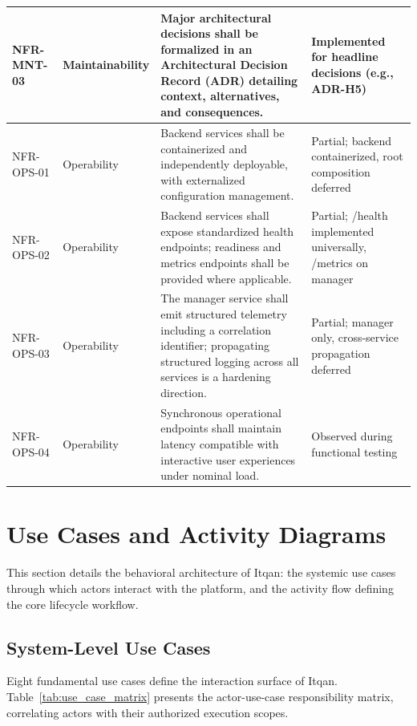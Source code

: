 \begin{longtable}{|p{2.2cm}|p{2.7cm}|>{\RaggedRight\arraybackslash}p{5.8cm}|p{2.7cm}|}
NFR-MNT-03 & Maintainability & Major architectural decisions shall be formalized in an Architectural Decision Record (ADR) detailing context, alternatives, and consequences. & Implemented for headline decisions (e.g., ADR-H5) \\ \hline
NFR-OPS-01 & Operability & Backend services shall be containerized and independently deployable, with externalized configuration management. & Partial; backend containerized, root composition deferred \\ \hline
NFR-OPS-02 & Operability & Backend services shall expose standardized health endpoints; readiness and metrics endpoints shall be provided where applicable. & Partial; /health implemented universally, /metrics on manager \\ \hline
NFR-OPS-03 & Operability & The manager service shall emit structured telemetry including a correlation identifier; propagating structured logging across all services is a hardening direction. & Partial; manager only, cross-service propagation deferred \\ \hline
NFR-OPS-04 & Operability & Synchronous operational endpoints shall maintain latency compatible with interactive user experiences under nominal load. & Observed during functional testing \\ \hline
\end{longtable}
\endgroup


\section{Use Cases and Activity Diagrams}\label{sec:use_cases}
This section details the behavioral architecture of Itqan: the systemic use cases through which actors interact with the platform, and the activity flow defining the core lifecycle workflow.

\subsection{System-Level Use Cases}
Eight fundamental use cases define the interaction surface of Itqan. Table~\ref{tab:use_case_matrix} presents the actor-use-case responsibility matrix, correlating actors with their authorized execution scopes.

